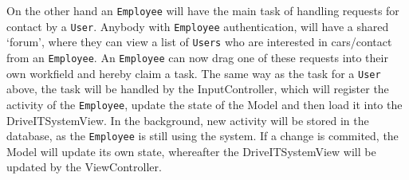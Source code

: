 On the other hand an \texttt{Employee} will have the main task of handling requests for contact by a \texttt{User}. Anybody with \texttt{Employee} authentication, will have a shared `forum', where they can view a list of \texttt{Users} who are interested in cars/contact from an \texttt{Employee}. An \texttt{Employee} can now drag one of these requests into their own workfield and hereby claim a task. The same way as the task for a \texttt{User} above, the task will be  handled by the InputController, which will register the activity of the \texttt{Employee}, update the state of the Model and then load it into the DriveITSystemView. In the background, new activity will be stored in the database, as the \texttt{Employee} is still using the system. If a change is commited, the Model will update its own state, whereafter the DriveITSystemView will be updated by the ViewController.\\